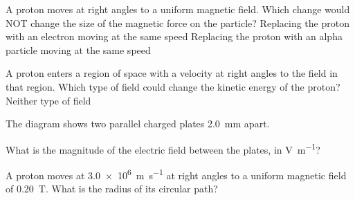
\begin{quizq}{}
A proton moves at right angles to a uniform magnetic field. Which change would NOT change the size of
the magnetic force on the particle?
  {Replacing the proton with an electron moving at the same speed}
  {Replacing the proton with an alpha particle moving at the same speed}
\end{quizq}

\begin{quizq}{}
A proton enters a region of space with a velocity at right angles to the field in that region.
Which type of field could change the kinetic energy of the proton?
  {Neither type of field}
\end{quizq}

\begin{quizq}{}
The diagram shows two parallel charged plates \qty{2.0}{mm} apart.
\begin{center}
\end{center}
What is the magnitude of the electric field between the plates, in \si{V.m^{-1}}?
\end{quizq}

\begin{quizq}{}
A proton moves at \qty{3.0e6}{m.s^{-1}} at right angles to a uniform magnetic field of
\qty{0.20}{T}. What is the radius of its circular path?
\end{quizq}

